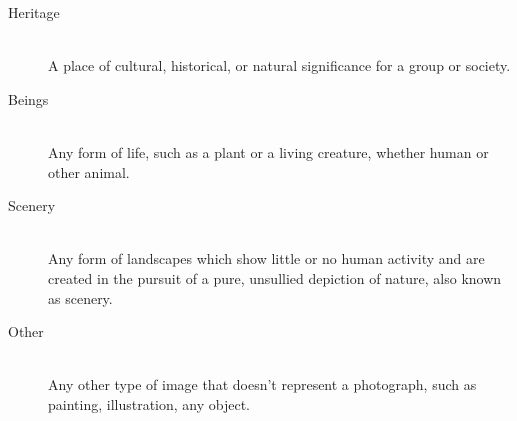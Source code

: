\documentclass[hidelinks,12pt,a4paper]{report}
\begin{document}
\begin{description}
\item[Heritage] \hfill \\ A place of cultural, historical, or natural significance for a group or society.
\item[Beings] \hfill \\ Any form of life, such as a plant or a living creature, whether human or other animal.
\item[Scenery] \hfill \\ Any form of landscapes which show little or no human activity and are created in the pursuit of a pure, unsullied depiction of nature, also known as scenery.
\item[Other] \hfill \\ Any other type of image that doesn't represent a photograph, such as painting, illustration, any object.	
\end{description}
\end{document}
